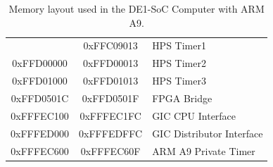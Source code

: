 \documentclass[11pt, twoside, pdftex]{article}
\newcommand{\commonFiles}{../../../common/doc}
\newcommand{\templatePath}{../../../common/templates}
\newcommand{\systemNameFull}{DE1-SoC Computer with ARM A9}
\begin{document}
\begin{table}[h]
\begin{center}
\begin{tabular}{c|c|l}
            & 0xFFC09013
            & HPS Timer1
        \\
            0xFFD00000
            & 0xFFD00013
            & HPS Timer2
        \\
            0xFFD01000
            & 0xFFD01013
            & HPS Timer3
        \\
            0xFFD0501C
            & 0xFFD0501F
            & FPGA Bridge
        \\
            0xFFFEC100
            & 0xFFFEC1FC
            & GIC CPU Interface
        \\
            0xFFFED000
            & 0xFFFEDFFC
            & GIC Distributor Interface
        \\
            0xFFFEC600
            & 0xFFFEC60F
            & ARM A9 Private Timer
        \\
    \end{tabular}
    \caption{Memory layout used in the \systemNameFull.}
    \label{tab:memorylayout}
    \end{center}
\end{table}




\clearpage











\end{document}
